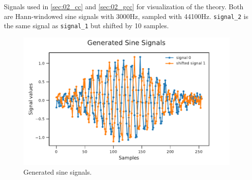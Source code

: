 Signals used in \cref{sec:02_cc} and \cref{sec:02_gcc} for visualization of the theory.
Both are Hann-windowed sine signals with 3000\si{Hz}, sampled with 44100\si{Hz}.
\lstinline!signal_2! is the same signal as \lstinline!signal_1! but shifted by
10 samples.
\begin{figure}[ht]
	\centering
		\includegraphics[width=1\columnwidth]{figures/signals_theory}
	\caption{Generated sine signals.}
	\label{fig:ap1_signals}
\end{figure}


